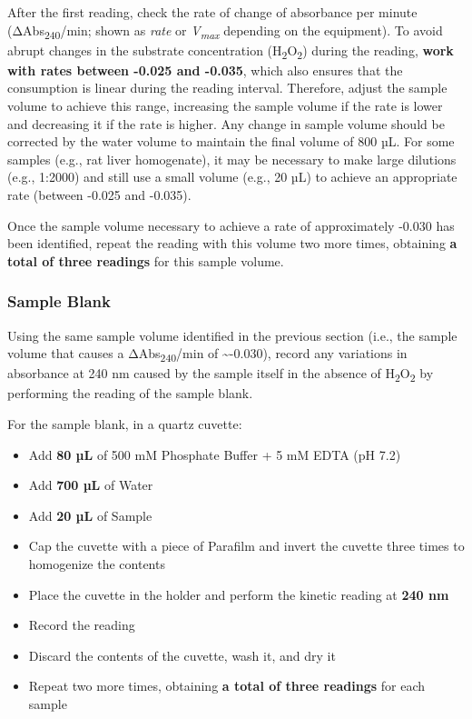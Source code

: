 \documentclass[
  9pt,
  american,
  a5paper,
  extrafontsizes,onecolumn,openright
  ]{memoir}
\providecommand{\tightlist}{%
  \setlength{\itemsep}{0pt}\setlength{\parskip}{0pt}}
\newlength{\rf}
\begin{document}
After the first reading, check the rate of change of absorbance per minute (ΔAbs\textsubscript{240}/min; shown as \emph{rate} or \emph{V\textsubscript{max}} depending on the equipment). To avoid abrupt changes in the substrate concentration (H\textsubscript{2}O\textsubscript{2}) during the reading, \textbf{work with rates between -0.025 and -0.035}, which also ensures that the consumption is linear during the reading interval. Therefore, adjust the sample volume to achieve this range, increasing the sample volume if the rate is lower and decreasing it if the rate is higher. Any change in sample volume should be corrected by the water volume to maintain the final volume of 800 µL. For some samples (e.g., rat liver homogenate), it may be necessary to make large dilutions (e.g., 1:2000) and still use a small volume (e.g., 20 µL) to achieve an appropriate rate (between -0.025 and -0.035).

Once the sample volume necessary to achieve a rate of approximately -0.030 has been identified, repeat the reading with this volume two more times, obtaining \textbf{a total of three readings} for this sample volume.

\subsubsection{Sample Blank}\label{sample_blank}

Using the same sample volume identified in the previous section (i.e., the sample volume that causes a ΔAbs\textsubscript{240}/min of \textasciitilde-0.030), record any variations in absorbance at 240 nm caused by the sample itself in the absence of H\textsubscript{2}O\textsubscript{2} by performing the reading of the sample blank.

For the sample blank, in a quartz cuvette:

\begin{itemize}
\tightlist
\item
  Add \textbf{80 µL} of 500 mM Phosphate Buffer + 5 mM EDTA (pH 7.2)
\item
  Add \textbf{700 µL} of Water
\item
  Add \textbf{20 µL} of Sample
\item
  Cap the cuvette with a piece of Parafilm and invert the cuvette three times to homogenize the contents
\item
  Place the cuvette in the holder and perform the kinetic reading at \textbf{240 nm}
\item
  Record the reading
\item
  Discard the contents of the cuvette, wash it, and dry it
\item
  Repeat two more times, obtaining \textbf{a total of three readings} for each sample
\end{itemize}
\end{document}
